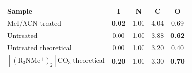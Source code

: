 \documentclass[border=2pt]{standalone}
\makeatletter
\renewenvironment{table}[1][]{%
    \begin{minipage}{\textwidth}\centering
    \def\@captype{table}%
}{%
    \end{minipage}%
}
\makeatother
\begin{document}

\begin{table}[htbp]
\centering
\caption{Elemental composition determined from XPS survey spectra. Atomic ratios are normalized to the total nitrogen concentration.}
\label{tab:XPSSurvey}

\renewcommand{\arraystretch}{1.25}

\begin{tabular}{lcccc}
\toprule
Sample & I & N & C & O \\
\midrule
MeI/ACN treated                      & \textbf{0.02} & 1.00 & 4.04 & 0.69 \\
Untreated                            & 0.00 & 1.00 & 3.88 & \textbf{0.62} \\
Untreated theoretical                & 0.00 & 1.00 & 3.20 & 0.40 \\
$[(\mathrm{R_3NMe^+})_2]\mathrm{CO_3}$ theoretical
                                     & \textbf{0.20} & 1.00 & 3.30 & \textbf{0.70} \\
\bottomrule
\end{tabular}
\end{table}
\end{document}
